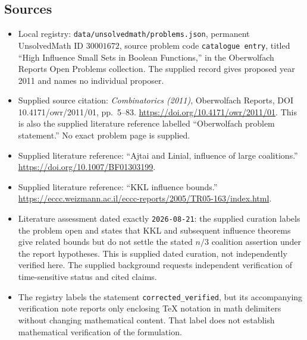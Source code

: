 \documentclass[11pt]{article}
\begin{document}
\subsection{Sources}
\begin{itemize}
\item Local registry: \texttt{data/unsolvedmath/problems.json}, permanent UnsolvedMath ID \(30001672\), source problem code \texttt{catalogue entry}, titled ``High Influence Small Sets in Boolean Functions,'' in the Oberwolfach Reports Open Problems collection. The supplied record gives proposed year 2011 and names no individual proposer.
\item Supplied source citation: \emph{Combinatorics (2011)}, Oberwolfach Reports, DOI 10.4171/owr/2011/01, pp.\ 5--83. \url{https://doi.org/10.4171/owr/2011/01}. This is also the supplied literature reference labelled ``Oberwolfach problem statement.'' No exact problem page is supplied.
\item Supplied literature reference: ``Ajtai and Linial, influence of large coalitions.'' \url{https://doi.org/10.1007/BF01303199}.
\item Supplied literature reference: ``KKL influence bounds.'' \url{https://eccc.weizmann.ac.il/eccc-reports/2005/TR05-163/index.html}.
\item Literature assessment dated exactly \texttt{2026-08-21}: the supplied curation labels the problem open and states that KKL and subsequent influence theorems give related bounds but do not settle the stated \(n/3\) coalition assertion under the report hypotheses. This is supplied dated curation, not independently verified here. The supplied background requests independent verification of time-sensitive status and cited claims.
\item The registry labels the statement \texttt{corrected\_verified}, but its accompanying verification note reports only enclosing TeX notation in math delimiters without changing mathematical content. That label does not establish mathematical verification of the formulation.
\end{itemize}
\end{document}
